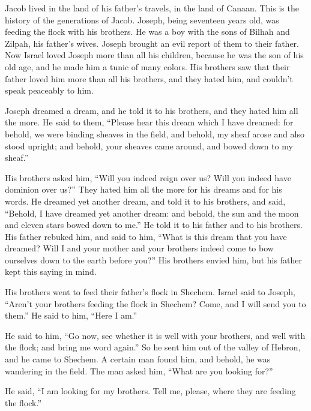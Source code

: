 \mychapter{}
\myverse*{}Jacob lived in the land of his father’s travels, in the land of Canaan.   \myverse{}This is the history of the generations of Jacob. Joseph, being seventeen years old, was feeding the flock with his brothers. He was a boy with the sons of Bilhah and Zilpah, his father’s wives. Joseph brought an evil report of them to their father.   \myverse{}Now Israel loved Joseph more than all his children, because he was the son of his old age, and he made him a tunic of many colors.   \myverse{}His brothers saw that their father loved him more than all his brothers, and they hated him, and couldn’t speak peaceably to him.

\myverse{}Joseph dreamed a dream, and he told it to his brothers, and they hated him all the more.   \myverse{}He said to them, “Please hear this dream which I have dreamed:   \myverse{}for behold, we were binding sheaves in the field, and behold, my sheaf arose and also stood upright; and behold, your sheaves came around, and bowed down to my sheaf.”

\myverse{}His brothers asked him, “Will you indeed reign over us? Will you indeed have dominion over us?” They hated him all the more for his dreams and for his words.   \myverse{}He dreamed yet another dream, and told it to his brothers, and said, “Behold, I have dreamed yet another dream: and behold, the sun and the moon and eleven stars bowed down to me.”   \myverse{}He told it to his father and to his brothers. His father rebuked him, and said to him, “What is this dream that you have dreamed? Will I and your mother and your brothers indeed come to bow ourselves down to the earth before you?”   \myverse{}His brothers envied him, but his father kept this saying in mind.

\myverse{}His brothers went to feed their father’s flock in Shechem.   \myverse{}Israel said to Joseph, “Aren’t your brothers feeding the flock in Shechem? Come, and I will send you to them.” He said to him, “Here I am.”

\myverse{}He said to him, “Go now, see whether it is well with your brothers, and well with the flock; and bring me word again.” So he sent him out of the valley of Hebron, and he came to Shechem.   \myverse{}A certain man found him, and behold, he was wandering in the field. The man asked him, “What are you looking for?”

\myverse{}He said, “I am looking for my brothers. Tell me, please, where they are feeding the flock.”

